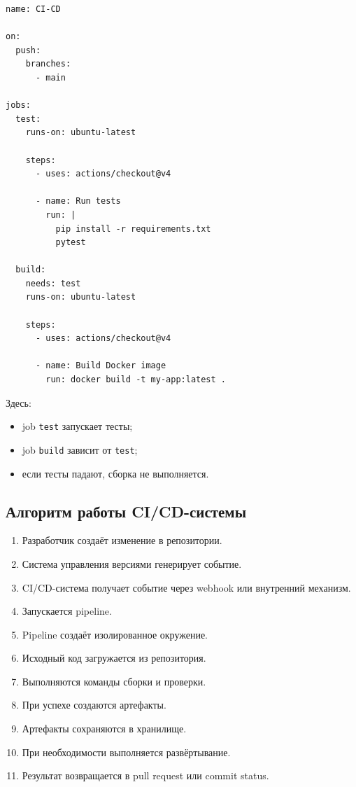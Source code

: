 \documentclass[12pt,a4paper]{article}
\begin{document}
\begin{lstlisting}
name: CI-CD

on:
  push:
    branches:
      - main

jobs:
  test:
    runs-on: ubuntu-latest

    steps:
      - uses: actions/checkout@v4

      - name: Run tests
        run: |
          pip install -r requirements.txt
          pytest

  build:
    needs: test
    runs-on: ubuntu-latest

    steps:
      - uses: actions/checkout@v4

      - name: Build Docker image
        run: docker build -t my-app:latest .
\end{lstlisting}

Здесь:

\begin{itemize}
    \item job \texttt{test} запускает тесты;
    \item job \texttt{build} зависит от \texttt{test};
    \item если тесты падают, сборка не выполняется.
\end{itemize}

\subsection{Алгоритм работы CI/CD-системы}

\begin{enumerate}
    \item Разработчик создаёт изменение в репозитории.
    \item Система управления версиями генерирует событие.
    \item CI/CD-система получает событие через webhook или внутренний механизм.
    \item Запускается pipeline.
    \item Pipeline создаёт изолированное окружение.
    \item Исходный код загружается из репозитория.
    \item Выполняются команды сборки и проверки.
    \item При успехе создаются артефакты.
    \item Артефакты сохраняются в хранилище.
    \item При необходимости выполняется развёртывание.
    \item Результат возвращается в pull request или commit status.
\end{enumerate}
\end{document}
